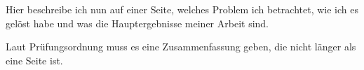 \begin{center} 
    \huge {}
\end{center}


Hier beschreibe ich nun auf einer Seite, welches Problem ich betrachtet, wie ich es gelöst habe
und was die Hauptergebnisse meiner Arbeit sind.

Laut Prüfungsordnung muss es eine Zusammenfassung geben, die nicht länger als eine Seite ist.
